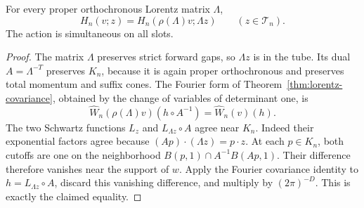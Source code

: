 \begin{proposition}\label{prop:tube-covariance}
For every proper orthochronous Lorentz matrix $\Lambda$,
\[
 H_n(v;z)=H_n(\rho(\Lambda)v;\Lambda z)
          \qquad(z\in\mathcal T_n).
\]
The action is simultaneous on all slots.
\end{proposition}
\begin{proof}
The matrix $\Lambda$ preserves strict forward gaps, so $\Lambda z$ is
in the tube. Its dual $A=\Lambda^{-T}$ preserves $K_n$, because it is
again proper orthochronous and preserves total momentum and suffix cones.
The Fourier form of Theorem~\ref{thm:lorentz-covariance}, obtained by
the change of variables of determinant one, is
\[
 \widehat W_n(\rho(\Lambda)v)(h\circ A^{-1})
       =\widehat W_n(v)(h).
\]
The two Schwartz functions $L_z$ and $L_{\Lambda z}\circ A$ agree
near $K_n$. Indeed their exponential factors agree because
$(Ap)\cdot(\Lambda z)=p\cdot z$. At each $p\in K_n$, both cutoffs
are one on the neighborhood
$B(p,1)\cap A^{-1}B(Ap,1)$. Their difference therefore vanishes near
the support of $w$. Apply the Fourier covariance identity to
$h=L_{\Lambda z}\circ A$, discard this vanishing difference, and multiply
by $(2\pi)^{-D}$. This is exactly the claimed equality.
\end{proof}
